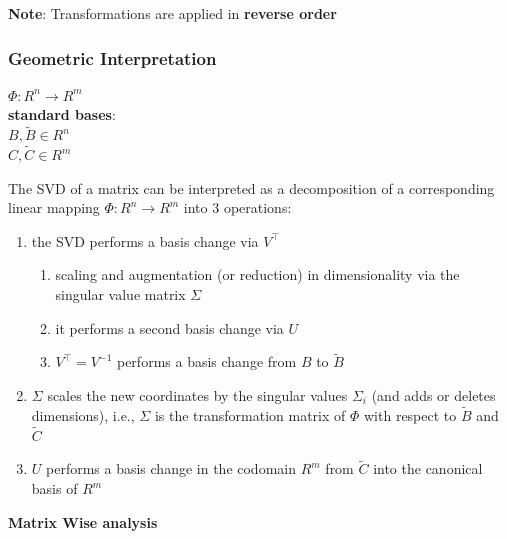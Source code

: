 \noindent\textbf{Note}: Transformations are applied in \textbf{reverse order}

\subsubsection{Geometric Interpretation}
$\Phi : R^n \to R^m$\\

\textbf{standard bases}:\\
$B, \tilde{B} \in R^n$\\
$C, \tilde{C} \in R^m$

\vspace{0.2cm}
\noindent The SVD of a matrix can be interpreted as a decomposition of a corresponding linear mapping $\Phi  : R^n \to R^m$ into 3 operations: 
\begin{enumerate}
    \item the SVD performs a basis change via $V^\top $ 

    \begin{enumerate}
        \item scaling and augmentation (or reduction) in dimensionality via the singular value matrix $\Sigma $
    
        \item it performs a second basis change via $U$
    
        \item $V^\top  = V^{-1}$ performs a basis change from $B$ to $\tilde{B}$
    \end{enumerate}

    \item $\Sigma$  scales the new coordinates by the singular values $\Sigma _i$ (and adds or deletes dimensions), i.e., $\Sigma$  is the transformation matrix of $\Phi$  with respect to $\tilde{B}$ and $\tilde{C}$

    \item $U$ performs a basis change in the codomain $R^m$ from $\tilde{C}$ into the canonical basis of $R^m$
\end{enumerate}


\vspace{0.2cm}
\noindent\textbf{Matrix Wise analysis}

